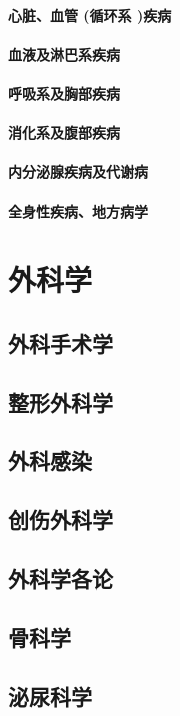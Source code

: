 \documentclass[UTF8]{../ApplicationUniverse}
\begin{document}
\subsubsection{心脏、血管 (循环系 )疾病}
\subsubsection{血液及淋巴系疾病}
\subsubsection{呼吸系及胸部疾病}
\subsubsection{消化系及腹部疾病}
\subsubsection{内分泌腺疾病及代谢病}
\subsubsection{全身性疾病、地方病学}






\chapter{外科学}
\section{外科手术学}
\section{整形外科学}
\section{外科感染}
\section{创伤外科学}
\section{外科学各论}
\section{骨科学}
\section{泌尿科学}
\end{document}

